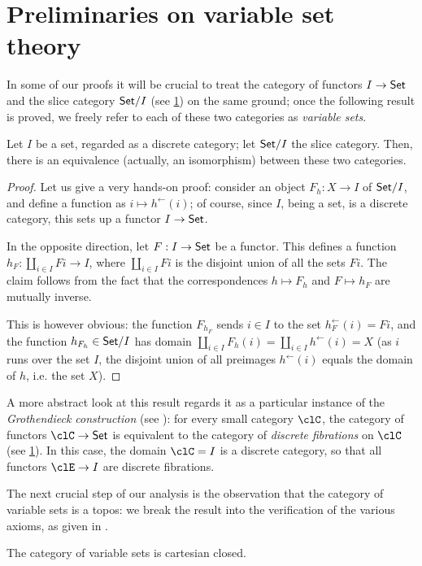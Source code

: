 \documentclass{amsart}
\begin{document}
\section{Preliminaries on variable set theory}
In some of our proofs it will be crucial to treat the category of functors $I \to \mathsf{Set}$ and the slice category $\mathsf{Set}/I$ (see \ref{}) on the same ground; once the following result is proved, we freely refer to each of these two categories as \emph{variable sets}.
\begin{proposition}
Let $I$ be a set, regarded as a discrete category; let $\mathsf{Set}/I$ the slice category. Then, there is an equivalence (actually, an isomorphism) between these two categories. 
\end{proposition}
\begin{proof}
  Let us give a very hands-on proof: consider an object $F_h : X\to I$ of $\mathsf{Set}/I$, and define a function as $i\mapsto h^\leftarrow(i)$; of course, since $I$, being a set, is a discrete category, this sets up a functor $I \to \mathsf{Set}$. 

  In the opposite direction, let $F : I \to \mathsf{Set}$ be a functor. This defines a function $h_F : \coprod_{i\in I}Fi \to I$, where $\coprod_{i\in I} Fi$ is the disjoint union of all the sets $Fi$.
  The claim follows from the fact that the correspondences $h\mapsto F_h$ and $F\mapsto h_F$ are mutually inverse.
  
  This is however obvious: the function $F_{h_F}$ sends $i\in I$ to the set $h_F^\leftarrow(i)=Fi$, and the function $h_{F_h} \in \mathsf{Set}/I$ has domain $\coprod_{i\in I}F_h(i) = \coprod_{i\in I}h^\leftarrow(i)=X$ (as $i$ runs over the set $I$, the disjoint union of all preimages $h^\leftarrow(i)$ equals the domain of $h$, i.e. the set $X$).
\end{proof}
\begin{remark}
  A more abstract look at this result regards it as a particular instance of the \emph{Grothendieck construction} (see \cite{}): for every small category $\clC$, the category of functors $\clC\to\Set$ is equivalent to the category of \emph{discrete fibrations} on $\clC$ (see \ref{}). In this case, the domain $\clC=I$ is a discrete category, so that all functors $\clE \to I$ are discrete fibrations.
\end{remark}
The next crucial step of our analysis is the observation that the category of variable sets is a topos: we break the result into the verification of the various axioms, as given in \cite{}.
\begin{proposition}
The category of variable sets is cartesian closed.
\end{proposition}
\end{document}
